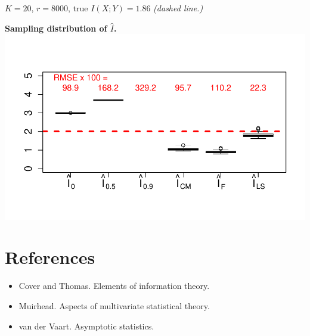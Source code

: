 \documentclass[12pt]{article}
\begin{document}
$K=20$, $r = 8000$, true $I(X; Y) = 1.86$ \emph{(dashed line.)}

\begin{center}
\textbf{Sampling distribution of $\hat{I}$.}
\includegraphics[scale = 0.6, clip = true, trim = 0 0.5in 0 0.5in]{../info_theory_sims/fig6.pdf}
\end{center}

\section{References}
\begin{itemize}
\item Cover and Thomas.  Elements of information theory.
\item Muirhead.  Aspects of multivariate statistical theory.
\item van der Vaart.  Asymptotic statistics.
\end{itemize}
\end{document}
